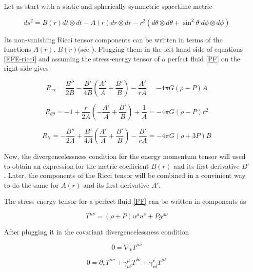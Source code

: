 Let us start with a static and spherically symmetric spacetime metric

\begin{equation}\label{metric}
ds^2 = B(r) dt \otimes dt - A(r) dr \otimes dr - r^2 (d\theta \otimes d\theta + \sin^2 \theta \; d\phi \otimes d\phi)
\end{equation}

Its non-vanishing Ricci tensor components  can be written in terms of the functions $A(r)$, $B(r)$(see \cite{Weinberg:1972kfs}). Plugging them in the left hand side of equations \ref{EFE-ricci} and assuming the stress-energy tensor of a perfect fluid \ref{PF} on the right side gives

\begin{equation}\label{E1}
R_{rr} = \frac{B''}{2B} - \frac{B'}{4B} \left( \frac{A'}{A}+\frac{B'}{B} \right) - \frac{A'}{rA} = -4\pi G(\rho-P) A
\end{equation}

\begin{equation}\label{E2}
R_{\theta \theta}  = -1 + \frac{r}{2A} \left( -\frac{A'}{A} + \frac{B'}{B} \right) + \frac{1}{A} = -4\pi G(\rho - P) r^2
\end{equation}

\begin{equation}\label{E3}
R_{tt} = - \frac{B''}{2A} + \frac{B'}{4A} \left( \frac{A'}{A}+\frac{B'}{B} \right) - \frac{B'}{rA} = - 4\pi G (\rho + 3P) B
\end{equation}

Now, the divergencelessness condition for the energy momentum tensor will used to obtain an expression for the metric coefficient $B(r)$ and its first derivative $B'$. Later, the components of the Ricci tensor will be combined in a convinient way to do the same for $A(r)$ and its first derivative $A'$. 

The stress-energy tensor for a perfect fluid \ref{PF} can be written in components as

\begin{equation}
T^{\mu \nu} = (\rho + P) u^\mu u^\nu + P g^{\mu \nu}
\end{equation}

After plugging it in the covariant divergencelessness condition 

\begin{equation}
0 = \nabla_\nu T^{\mu \nu}
\end{equation}

\begin{equation}
0 =  \partial_\nu T^{\mu \nu} + \gamma^\mu_{\nu \delta} T^{\delta \nu} + \gamma^\nu_{\nu \delta} T^{\mu \delta}
\end{equation}

